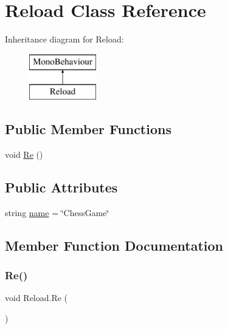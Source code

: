 \hypertarget{class_reload}{}\section{Reload Class Reference}
\label{class_reload}
Inheritance diagram for Reload\+:\begin{figure}[H]
\begin{center}
\leavevmode
\includegraphics[height=2.000000cm]{class_reload}
\end{center}
\end{figure}
\subsection*{Public Member Functions}
\begin{DoxyCompactItemize}
\item 
void \mbox{\hyperlink{class_reload_a196037885896ca2a3d05e11eb75fcdb1}{Re}} ()
\end{DoxyCompactItemize}
\subsection*{Public Attributes}
\begin{DoxyCompactItemize}
\item 
string \mbox{\hyperlink{class_reload_a1c7abc2a97caa3db3217948dcd0f3da5}{name}} = \char`\"{}Chess\+Game\char`\"{}
\end{DoxyCompactItemize}


\subsection{Member Function Documentation}
\mbox{\label{class_reload_a196037885896ca2a3d05e11eb75fcdb1}} 
\subsubsection{\texorpdfstring{Re()}{Re()}}
{\footnotesize\ttfamily void Reload.\+Re (\begin{DoxyParamCaption}{ }\end{DoxyParamCaption})\hspace{0.3cm}{\ttfamily [inline]}}




